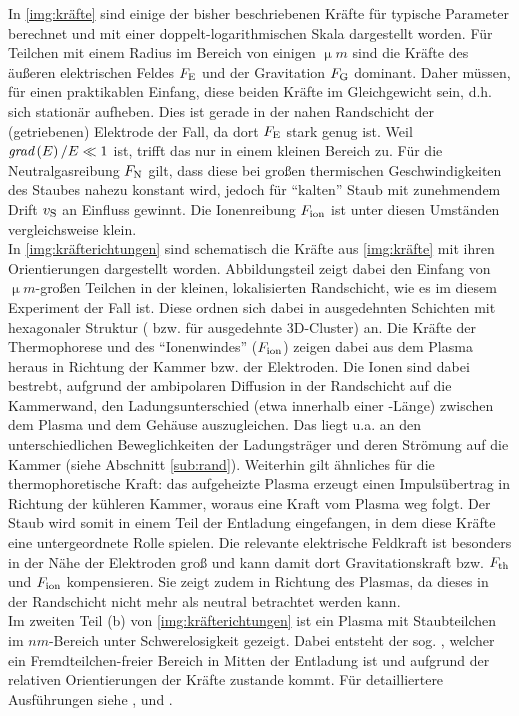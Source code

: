     In \autoref{img:kräfte} sind einige der bisher beschriebenen Kräfte für typische Parameter berechnet und mit einer doppelt-logarithmischen Skala dargestellt worden. Für Teilchen mit einem Radius im Bereich von einigen $\unit{\upmu m}$ sind die Kräfte des äußeren elektrischen Feldes $F_\text{E}$ und der Gravitation $F_\text{G}$ dominant. Daher müssen, für einen praktikablen Einfang, diese beiden Kräfte im Gleichgewicht sein, d.h. sich stationär aufheben. Dies ist gerade in der nahen Randschicht der (getriebenen) Elektrode der Fall, da dort $F_\text{E}$ stark genug ist. Weil $\textit{grad}\left(E\right)/E\ll1$ ist, trifft das nur in einem kleinen Bereich zu. Für die Neutralgasreibung $F_\text{N}$ gilt, dass diese bei großen thermischen Geschwindigkeiten des Staubes nahezu konstant wird, jedoch für "`kalten"' Staub mit zunehmendem Drift $v_\text{S}$ an Einfluss gewinnt. Die Ionenreibung $F_\text{ion}$ ist unter diesen Umständen vergleichsweise klein.\\
    In \autoref{img:kräfterichtungen} sind schematisch die Kräfte aus \autoref{img:kräfte} mit ihren Orientierungen dargestellt worden. Abbildungsteil  zeigt dabei den Einfang von $\unit{\upmu m}$-großen Teilchen in der kleinen, lokalisierten Randschicht, wie es im diesem Experiment der Fall ist. Diese ordnen sich dabei in ausgedehnten Schichten mit hexagonaler Struktur ( bzw.  für ausgedehnte 3D-Cluster) an. Die Kräfte der Thermophorese und des "`Ionenwindes"' ($F_\text{ion}$) zeigen dabei aus dem Plasma heraus in Richtung der Kammer bzw. der Elektroden. Die Ionen sind dabei bestrebt, aufgrund der ambipolaren Diffusion in der Randschicht auf die Kammerwand, den Ladungsunterschied (etwa innerhalb einer -Länge) zwischen dem Plasma und dem Gehäuse auszugleichen. Das liegt u.a. an den unterschiedlichen Beweglichkeiten der Ladungsträger und deren Strömung auf die Kammer (siehe Abschnitt \ref{sub:rand}). Weiterhin gilt ähnliches für die thermophoretische Kraft: das aufgeheizte Plasma erzeugt einen Impulsübertrag in Richtung der kühleren Kammer, woraus eine Kraft vom Plasma weg folgt. Der Staub wird somit in einem Teil der Entladung eingefangen, in dem diese Kräfte eine untergeordnete Rolle spielen. Die relevante elektrische Feldkraft ist besonders in der Nähe der Elektroden groß und kann damit dort Gravitationskraft bzw. $F_\text{th}$ und $F_\text{ion}$ kompensieren. Sie zeigt zudem in Richtung des Plasmas, da dieses in der Randschicht nicht mehr als neutral betrachtet werden kann.\\
    Im zweiten Teil (b) von \autoref{img:kräfterichtungen} ist ein Plasma mit Staubteilchen im $\unit{nm}$-Bereich unter Schwerelosigkeit gezeigt. Dabei entsteht der sog. , welcher ein Fremdteilchen-freier Bereich in Mitten der Entladung ist und aufgrund der relativen Orientierungen der Kräfte zustande kommt. Für detailliertere Ausführungen siehe \cite{Dorier95}, \cite{Morfill99} und \cite{Goree99a}.

